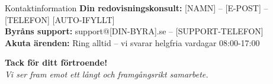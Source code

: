 \documentclass[10pt]{beamer}
\begin{document}
\begin{frame}[fragile]
  \begin{block}{Kontaktinformation}
    \footnotesize
    \textbf{Din redovisningskonsult:} [NAMN] – [E-POST] – [TELEFON] [AUTO-IFYLLT]\\
    \textbf{Byråns support:} support@[DIN-BYRA].se – [SUPPORT-TELEFON]\\
    \textbf{Akuta ärenden:} Ring alltid – vi svarar helgfria vardagar 08:00-17:00
  \end{block}

  \vspace{0.4cm}
  \begin{center}
    \Large\textbf{Tack för ditt förtroende!}\\
    \vspace{0.2cm}
    \normalsize\textit{Vi ser fram emot ett långt och framgångsrikt samarbete.}
  \end{center}

  \vspace{0.5cm}
  \begin{flushright}
  \end{flushright}

\end{frame}


\end{document}
